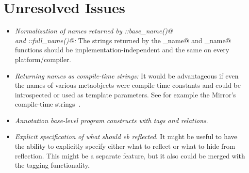 \section{Unresolved Issues}

\begin{itemize}
	\item {\em Normalization of names returned by \verb@Named::base_name()@\\and \verb@Named::full_name()@:}
	The strings returned by the \verb@base_name@ and \verb@full_name@ functions should be
	implementation-independent and the same on every platform/compiler.
	
	\item {\em Returning names as compile-time strings:} It would be advantageous if even
	the names of various metaobjects were compile-time constants and could be introspected
	or used as template parameters. See for example the Mirror's compile-time strings~\cite{mirror-ct-strings}.

	\item {\em Annotation base-level program constructs with tags and relations}.

	\item {\em Explicit specification of what should eb reflected}. It might be useful to have
	the ability to explicitly specify either what to reflect or what to hide from reflection.
	This might be a separate feature, but it also could be merged with the tagging functionality.
\end{itemize}
